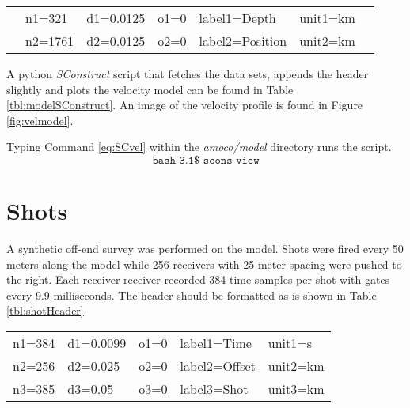 \begin{center}
{
\begin{tabular}[t]{|clllllc|}
        \hline
          &  n1=321   &      d1=0.0125    &   o1=0        &       label1=Depth  &       unit1=km &  \\
          &  n2=1761  &      d2=0.0125    &   o2=0        &       label2=Position &     unit2=km &  \\
        \hline
\end{tabular}
}
\end{center}

A python \emph{SConstruct} script that fetches the data sets, appends the header slightly and plots the velocity 
model can be found in Table \ref{tbl:modelSConstruct}.  An image of the velocity profile is found in Figure 
\ref{fig:velmodel}. 

{
\tiny

\normalsize
}

Typing Command \ref{eq:SCvel} within the \emph{amoco\slash model} directory runs the script.
\begin{equation}\label{eq:SCvel} \texttt{bash-3.1\$\ scons\ view} \end{equation}


\section{Shots}
A synthetic off-end survey was performed on the model.  Shots were fired every 50 meters along the model while 256 
receivers with 25 meter spacing were pushed to the right.  Each receiver receiver recorded 384 time samples per shot 
with gates every 9.9 milliseconds.  The header should be formatted as is shown in Table \ref{tbl:shotHeader} 

{
\begin{tabular}[frame=single]{|lllll|}
        \hline
    n1=384  &       d1=0.0099  &    o1=0  &        label1=Time       &   unit1=s  \\
    n2=256  &       d2=0.025   &    o2=0  &        label2=Offset  &   unit2=km   \\
    n3=385  &       d3=0.05    &    o3=0  &        label3=Shot    &   unit3=km   \\
        \hline
\end{tabular}
}

